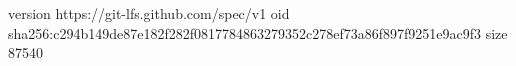 version https://git-lfs.github.com/spec/v1
oid sha256:c294b149de87e182f282f0817784863279352c278ef73a86f897f9251e9ac9f3
size 87540
